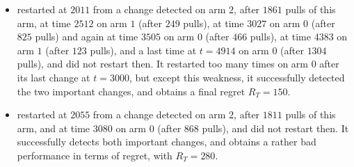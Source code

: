 \begin{itemize}
    \item
    \CUSUMklUCB{} restarted at $2011$ from a change detected on arm $2$, after $1861$ pulls of this arm, at time $2512$ on arm $1$ (after $249$ pulls), at time $3027$ on arm $0$ (after $825$ pulls) and again at time $3505$ on arm $0$ (after $466$ pulls), at time $4383$ on arm $1$ (after $123$ pulls), and a last time at $t=4914$ on arm $0$ (after $1304$ pulls), and did not restart then.
    It restarted too many times on arm $0$ after its last change at $t=3000$, but except this weakness, it successfully detected the two important changes, and obtains a final regret $R_T = 150$.

    \item
    \MklUCB{} restarted at $2055$ from a change detected on arm $2$, after $1811$ pulls of this arm, and at time $3080$ on arm $0$ (after $868$ pulls), and did not restart then.
    It successfully detects both important changes, and obtains a rather bad performance in terms of regret, with $R_T = 280$.
\end{itemize}


